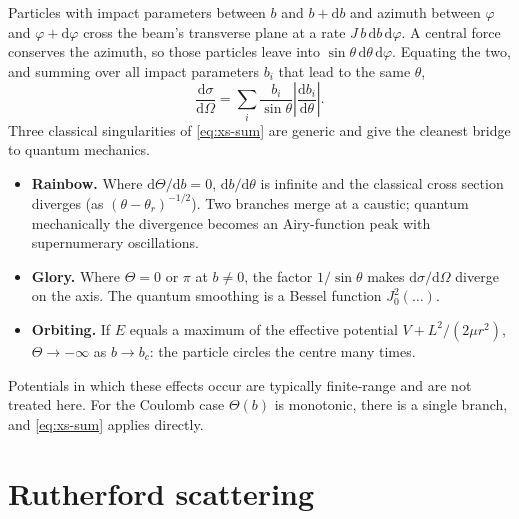 \documentclass[11pt,a4paper]{book}
\numberwithin{equation}{chapter}
\newcommand{\dd}{\mathrm{d}}
\newcommand{\dsdO}{\frac{\dd\sigma}{\dd\Omega}}
\begin{document}
Particles with impact parameters between $b$ and $b+\dd b$ and azimuth between
$\varphi$ and $\varphi+\dd\varphi$ cross the beam's transverse plane at a rate
$J\,b\,\dd b\,\dd\varphi$. A central force conserves the azimuth, so those
particles leave into $\sin\theta\,\dd\theta\,\dd\varphi$. Equating the two, and
summing over all impact parameters $b_i$ that lead to the same $\theta$,
\begin{equation}\label{eq:xs-sum}
  \dsdO=\sum_i\frac{b_i}{\sin\theta}\left|\frac{\dd b_i}{\dd\theta}\right| .
\end{equation}
Three classical singularities of \eqref{eq:xs-sum} are generic and give the
cleanest bridge to quantum mechanics.
\begin{itemize}
  \item \textbf{Rainbow.} Where $\dd\Theta/\dd b=0$, $\dd b/\dd\theta$ is
        infinite and the classical cross section diverges (as
        $(\theta-\theta_r)^{-1/2}$). Two branches merge at a caustic; quantum
        mechanically the divergence becomes an Airy-function peak with
        supernumerary oscillations.
  \item \textbf{Glory.} Where $\Theta=0$ or $\pi$ at $b\neq0$, the factor
        $1/\sin\theta$ makes $\dd\sigma/\dd\Omega$ diverge on the axis. The
        quantum smoothing is a Bessel function $J_0^2(\dots)$.
  \item \textbf{Orbiting.} If $E$ equals a maximum of the effective potential
        $V+L^2/(2\mu r^2)$, $\Theta\to-\infty$ as $b\to b_c$: the particle
        circles the centre many times.
\end{itemize}
Potentials in which these effects occur are typically finite-range and are not
treated here. For the Coulomb case $\Theta(b)$ is monotonic, there is a single
branch, and \eqref{eq:xs-sum} applies directly.

\section{Rutherford scattering}
\end{document}
